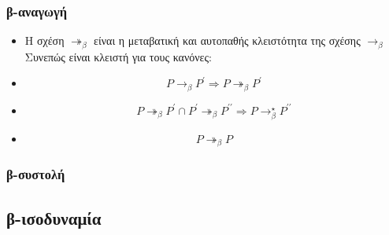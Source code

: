 \documentclass{beamer}
\begin{document}
\begin{frame}
        \frametitle{β-αναγωγή}
        \begin{itemize}
        	
            \item Η σχέση $\twoheadrightarrow _\beta$ είναι η μεταβατική και αυτοπαθής κλειστότητα της σχέσης
                  $\rightarrow _\beta$ \\ Συνεπώς είναι κλειστή για τους κανόνες: 
            \pause
            \item $$P \rightarrow  _{\beta} P ^{\prime} \Rightarrow P \twoheadrightarrow _{\beta} P ^{\prime}$$
            \pause
            \item $$P \twoheadrightarrow _{\beta} P ^{\prime} \cap P ^{\prime} \twoheadrightarrow _{\beta} P ^{\prime \prime}
                  \Rightarrow P \rightarrow ^{\star} _{\beta} P ^{\prime \prime}$$
			\pause
            \item $$P \twoheadrightarrow _{\beta} P$$
            
        \end{itemize}
\end{frame}

\begin{frame}
        \frametitle{β-συστολή}
\end{frame}

\subsection{β-ισοδυναμία}
\end{document}
